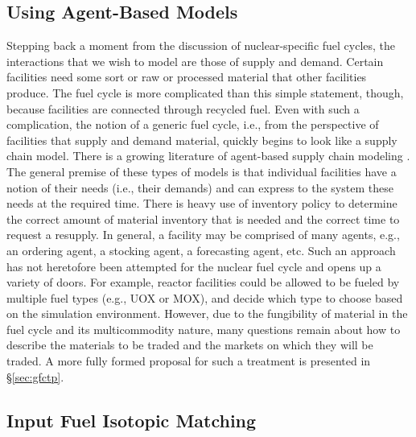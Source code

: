 \subsection{Using Agent-Based Models}

Stepping back a moment from the discussion of nuclear-specific fuel cycles, the
interactions that we wish to model are those of supply and demand. Certain
facilities need some sort or raw or processed material that other facilities
produce. The fuel cycle is more complicated than this simple statement, though,
because facilities are connected through recycled fuel. Even with such a
complication, the notion of a generic fuel cycle, i.e., from the perspective of
facilities that supply and demand material, quickly begins to look like a supply
chain model. There is a growing literature of agent-based supply chain modeling
\cite{swaminathan_modeling_1998,julka_agent-based_2002,van_der_zee_modeling_2005,chatfield_multi-formalism_2007,holmgren_agent_2007}.
The general premise of these types of models is that individual facilities have
a notion of their needs (i.e., their demands) and can express to the system
these needs at the required time. There is heavy use of inventory policy to
determine the correct amount of material inventory that is needed and the
correct time to request a resupply. In general, a facility may be comprised of
many agents, e.g., an ordering agent, a stocking agent, a forecasting agent,
etc. Such an approach has not heretofore been attempted for the nuclear fuel
cycle and opens up a variety of doors. For example, reactor facilities could be
allowed to be fueled by multiple fuel types (e.g., UOX or MOX), and decide which
type to choose based on the simulation environment. However, due to the
fungibility of material in the fuel cycle and its multicommodity nature, many
questions remain about how to describe the materials to be traded and the
markets on which they will be traded. A more fully formed proposal for such a
treatment is presented in \S\ref{sec:gfctp}.

\subsection{Input Fuel Isotopic Matching}

